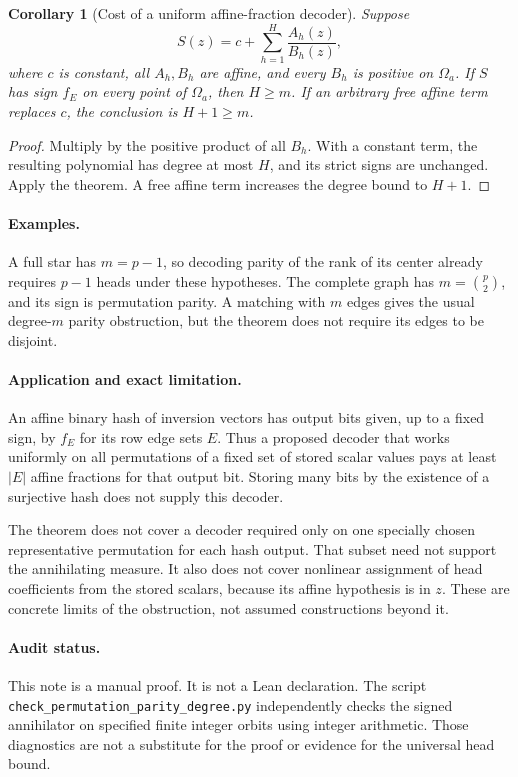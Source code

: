 \documentclass[11pt]{article}
\newtheorem{corollary}[theorem]{Corollary}
\begin{document}
\begin{corollary}[Cost of a uniform affine-fraction decoder]
Suppose
\[
 S(z)=c+\sum_{h=1}^H\frac{A_h(z)}{B_h(z)},
\]
where $c$ is constant, all $A_h,B_h$ are affine, and every $B_h$ is
positive on $\Omega_a$. If $S$ has sign $f_E$ on every point of
$\Omega_a$, then $H\ge m$.
If an arbitrary free affine term replaces $c$, the conclusion is
$H+1\ge m$.
\end{corollary}
\begin{proof}
Multiply by the positive product of all $B_h$. With a constant term,
the resulting polynomial has degree at most $H$, and its strict
signs are unchanged. Apply the theorem. A free affine term increases
the degree bound to $H+1$.
\end{proof}

\paragraph{Examples.}
A full star has $m=p-1$, so decoding parity of the rank of its center
already requires $p-1$ heads under these hypotheses. The complete graph
has $m=\binom p2$, and its sign is permutation parity. A matching with
$m$ edges gives the usual degree-$m$ parity obstruction, but the theorem
does not require its edges to be disjoint.

\paragraph{Application and exact limitation.}
An affine binary hash of inversion vectors has output bits given, up
to a fixed sign, by $f_E$ for its row edge sets $E$. Thus a proposed
decoder that works uniformly on all permutations of a fixed set of
stored scalar values pays at least $|E|$ affine fractions for that
output bit. Storing many bits by the existence of a surjective hash
does not supply this decoder.

The theorem does not cover a decoder required only on one specially
chosen representative permutation for each hash output. That subset
need not support the annihilating measure. It also does not cover
nonlinear assignment of head coefficients from the stored scalars,
because its affine hypothesis is in $z$. These are concrete limits of
the obstruction, not assumed constructions beyond it.

\paragraph{Audit status.}
This note is a manual proof. It is not a Lean declaration. The script
\texttt{check\_permutation\_parity\_degree.py} independently checks the
signed annihilator on specified finite integer orbits using integer
arithmetic. Those diagnostics are not a substitute for the proof or
evidence for the universal head bound.
\end{document}
